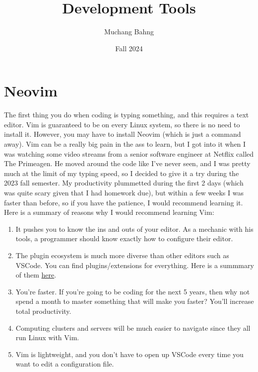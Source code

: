 \documentclass{article}
\begin{document}
\title{Development Tools}
\author{Muchang Bahng}
\date{Fall 2024}

\maketitle
\tableofcontents
\pagebreak

\section{Neovim} 

  The first thing you do when coding is typing something, and this requires a text editor. Vim is guaranteed to be on every Linux system, so there is no need to install it. However, you may have to install Neovim (which is just a command away). Vim can be a really big pain in the ass to learn, but I got into it when I was watching some video streams from a senior software engineer at Netflix called The Primeagen. He moved around the code like I've never seen, and I was pretty much at the limit of my typing speed, so I decided to give it a try during the 2023 fall semester. My productivity plummetted during the first 2 days (which was quite scary given that I had homework due), but within a few weeks I was faster than before, so if you have the patience, I would recommend learning it. Here is a summary of reasons why I would recommend learning Vim: 
  \begin{enumerate}
    \item It pushes you to know the ins and outs of your editor. As a mechanic with his tools, a programmer should know exactly how to configure their editor.  
    \item The plugin ecosystem is much more diverse than other editors such as VSCode. You can find plugins/extensions for everything. Here is a summmary of them \href{https://github.com/rockerBOO/awesome-neovim\#neovim-lua-development}{here}. 
    \item You're faster. If you're going to be coding for the next 5 years, then why not spend a month to master something that will make you faster? You'll increase total productivity. 
    \item Computing clusters and servers will be much easier to navigate since they all run Linux with Vim. 
    \item Vim is lightweight, and you don't have to open up VSCode every time you want to edit a configuration file.  
  \end{enumerate}
\end{document}
